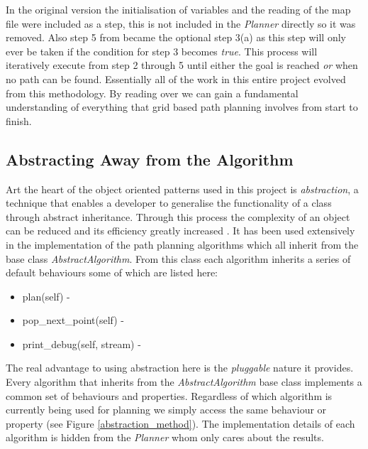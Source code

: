 \noindent
In the original version the initialisation of variables and the reading of the map file were included as a step, this is not included in the \textit{Planner} directly so it was removed. Also step 5 from \cite{GRIDNAV95} became the optional step 3(a) as this step will only ever be taken if the condition for step 3 becomes \textit{true}. This process will iteratively execute from step 2 through 5 until either the goal is reached \textit{or} when no path can be found. Essentially all of the work in this entire project evolved from this methodology. By reading over \cite{GRIDNAV95} we can gain a fundamental understanding of everything that grid based path planning involves from start to finish. 

\subsection{Abstracting Away from the Algorithm}
\noindent
Art the heart of the object oriented patterns used in this project is \textit{abstraction}, a technique that enables a developer to generalise the functionality of a class through abstract inheritance. Through this process the complexity of an object can be reduced and its efficiency greatly increased \cite{http://whatis.techtarget.com/definition/abstraction}. It has been used extensively in the implementation of the path planning algorithms which all inherit from the base class \textit{AbstractAlgorithm}. From this class each algorithm inherits a series of default behaviours some of which are listed here:

\newpage

\begin{itemize}
\item plan(self) -
\item pop\_next\_point(self) - 
\item print\_debug(self, stream) - 
\end{itemize}

\noindent
The real advantage to using abstraction here is the \textit{pluggable} nature it provides. Every algorithm that inherits from the \textit{AbstractAlgorithm} base class implements a common set of behaviours and properties. Regardless of which algorithm is currently being used for planning we simply access the same behaviour or property (see Figure \ref{abstraction_method}). The implementation details of each algorithm is hidden from the \textit{Planner} whom only cares about the results.

